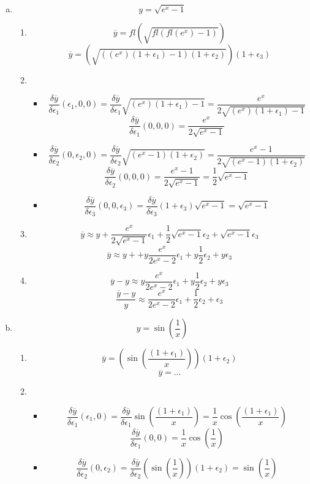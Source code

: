 \documentclass[12pt,a4paper]{article}
\begin{document}
\begin{enumerate}[(a)]
\item
\[
y= \sqrt{e^x -1}
\]
\begin{enumerate}[1.]
\item
\[
\overline{y} = fl\left(\sqrt{fl(fl(e^x) - 1)}\right)
\]
\[
\overline{y} = \left(\sqrt{((e^x)(1+\epsilon_1) -1)(1+\epsilon_2)}\right)(1+\epsilon_3)
\]
\item
\begin{itemize}
\item
\[
\frac{\delta\overline{y}}{\delta\epsilon_1}(\epsilon_1,0,0)
= \frac{\delta\overline{y}}{\delta\epsilon_1}
\sqrt{(e^x)(1+\epsilon_1) -1}
= 
\frac{e^x}{2\sqrt{(e^x)(1+\epsilon_1) -1}}
\]
\[
\frac{\delta\overline{y}}{\delta\epsilon_1}(0,0,0)
= \frac{e^x}{2\sqrt{e^x -1}}
\]
\item
\[
\frac{\delta\overline{y}}{\delta\epsilon_2}(0,\epsilon_2,0)
= \frac{\delta\overline{y}}{\delta\epsilon_2}
\sqrt{(e^x -1)(1+\epsilon_2)}
= \frac{e^x -1}{2\sqrt{(e^x -1)(1+\epsilon_2)}}
\]
\[
\frac{\delta\overline{y}}{\delta\epsilon_2}(0,0,0)
= \frac{e^x -1}{2\sqrt{e^x -1}} = \frac{1}{2}\sqrt{e^x -1}
\]
\item
\[
\frac{\delta\overline{y}}{\delta\epsilon_3}(0,0,\epsilon_3)
= \frac{\delta\overline{y}}{\delta\epsilon_3}
(1+\epsilon_3)\sqrt{e^x -1}
= \sqrt{e^x -1}
\]

\end{itemize}
\item
\[
\overline{y} \approx y +
\frac{e^x}{2\sqrt{e^x -1}} \epsilon_1
+
\frac{1}{2}\sqrt{e^x -1} \epsilon_2
+
\sqrt{e^x -1} \epsilon_3
\]
\[
\overline{y} \approx y +
+
y \frac{e^x}{2e^x -2} \epsilon_1
+
y \frac{1}{2} \epsilon_2
+
y \epsilon_3
\]
\item
\[
\overline{y} - y \approx 
y \frac{e^x}{2e^x -2} \epsilon_1
+
y \frac{1}{2} \epsilon_2
+
y \epsilon_3
\]
\[
\frac{\overline{y}-y}{y} \approx 
\frac{e^x}{2e^x -2} \epsilon_1
+
\frac{1}{2} \epsilon_2
+
\epsilon_3
\]
\end{enumerate}

\item
\[
y= \sin\left(\frac{1}{x}\right)
\]
\begin{enumerate}[1.]
\item
\[
\overline{y} = \left( \sin\left(\frac{(1+\epsilon_1)}{x}\right) \right)(1+\epsilon_2)
\]
\[
\overline{y} = ...
\]
\item
\begin{itemize}
\item
\[
\frac{\delta\overline{y}}{\delta\epsilon_1}(\epsilon_1,0)
= \frac{\delta\overline{y}}{\delta\epsilon_1}
\sin\left(\frac{(1+\epsilon_1)}{x}\right)
= \frac{1}{x}\cos\left(\frac{(1+\epsilon_1)}{x}\right)
\]
\[
\frac{\delta\overline{y}}{\delta\epsilon_1}(0,0)
= \frac{1}{x}\cos\left(\frac{1}{x}\right)
\]
\item
\[
\frac{\delta\overline{y}}{\delta\epsilon_2}(0,\epsilon_2)
= \frac{\delta\overline{y}}{\delta\epsilon_2}
\left(\sin\left(\frac{1}{x}\right)\right)(1+\epsilon_2)
= \sin\left(\frac{1}{x}\right)
\]


\end{itemize}
\end{enumerate}
\end{enumerate}
\end{document}

